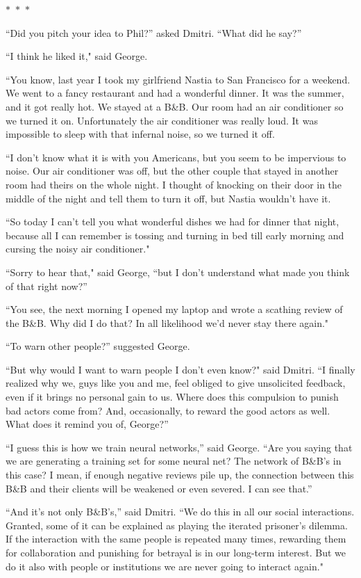 \documentclass{memoir}
\newcommand{\starbreak}{%
\begin{center}
  $\ast$~$\ast$~$\ast$
\end{center}
}
\begin{document}
\starbreak

``Did you pitch your idea to Phil?'' asked Dmitri. ``What did he say?''

``I think he liked it," said George.

``You know, last year I took my girlfriend Nastia to San Francisco for a weekend. We went to a fancy restaurant and had a wonderful dinner. It was the summer, and it got really hot. We stayed at a B\&B. Our room had an air conditioner so we turned it on. Unfortunately the air conditioner was really loud. It was impossible to sleep with that infernal noise, so we turned it off. 

``I don't know what it is with you Americans, but you seem to be impervious to noise. Our air conditioner was off, but the other couple that stayed in another room had theirs on the whole night. I thought of knocking on their door in the middle of the night and tell them to turn it off, but Nastia wouldn't have it. 

``So today I can't tell you what wonderful dishes we had for dinner that night, because all I can remember is tossing and turning in bed till early morning and cursing the noisy air conditioner."

``Sorry to hear that," said George, ``but I don't understand what made you think of that right now?''

``You see, the next morning I opened my laptop and wrote a scathing review of the B\&B. Why did I do that? In all likelihood we'd never stay there again."

``To warn other people?'' suggested George.

``But why would I want to warn people I don't even know?" said Dmitri. ``I finally realized why we, guys like you and me, feel obliged to give unsolicited feedback, even if it brings no personal gain to us. Where does this compulsion to punish bad actors come from? And, occasionally, to reward the good actors as well. What does it remind you of, George?''

``I guess this is how we train neural networks,'' said George. ``Are you saying that we are generating a training set for some neural net? The network of B\&B's in this case? I mean, if enough negative reviews pile up, the connection between this B\&B and their clients will be weakened or even severed. I can see that.''

``And it's not only B\&B's,'' said Dmitri. ``We do this in all our social interactions. Granted, some of it can be explained as playing the iterated prisoner's dilemma. If the interaction with the same people is repeated many times, rewarding them for collaboration and punishing for betrayal is in our long-term interest. But we do it also with people or institutions we are never going to interact again."
\end{document}
